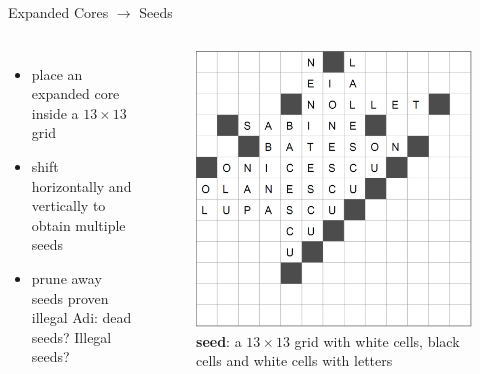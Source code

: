 \documentclass[aspectratio=169,usenames,dvipsnames]{beamer}
\newcommand{\tcm}[1]{\textcolor{m7}{#1}}
\newcommand{\bei}{\begin{itemize}}
\newcommand{\eei}{\end{itemize}}
\newcommand{\ie}{\item}
\numberwithin{equation}{section}
\numberwithin{theorem}{section}
\numberwithin{lem}{section}
\numberwithin{df}{section}
\begin{document}
\begin{frame}{Expanded Cores $\to$ Seeds}

\begin{columns}

\bei
\ie place an expanded core inside a $13\times13$ grid

\medskip

\ie shift horizontally and vertically to obtain multiple seeds

\medskip

\ie prune away seeds proven illegal \tcm{Adi: dead seeds? Illegal seeds?}
\eei


\begin{figure}
\includegraphics[width=0.9\columnwidth]{_plots/alive-0-puzzle-72-2975-1488--1--1.png}
\vspace{-0.25cm}
\caption{{\bf seed}: a $13\times13$ grid with white cells, black cells and white cells with letters}
\end{figure}

\end{columns}

\end{frame}

\end{document}
